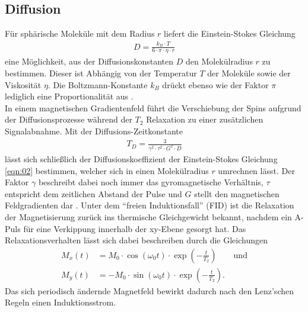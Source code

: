 \subsection{Diffusion}
\noindent Für sphärische Moleküle mit dem Radius $r$ liefert die
Einstein-Stokes Gleichung
\begin{align}
  D = \frac{k_B \cdot T}{6 \cdot \pi \cdot \eta \cdot r}
  \label{eqn:02}
\end{align}
\noindent eine Möglichkeit, aus der Diffusionskonstanten $D$ den Molekülradius
$r$ zu bestimmen. Dieser ist Abhängig von der Temperatur $T$ der Moleküle sowie
der Viskosität $\eta$. Die Boltzmann-Konstante $k_B$ drückt ebenso wie der
Faktor $\pi$ lediglich eine Proportionalität aus \cite{stokes}. \\
\noindent In einem magnetischen Gradientenfeld führt die Verschiebung der Spins
aufgrund der Diffusionsprozesse während der $T_2$ Relaxation zu einer
zusätzlichen Signalabnahme. Mit der Diffusions-Zeitkonstante
\begin{align}
  T_D = \frac{3}{\gamma^2 \cdot \tau^2 \cdot G^2 \cdot D}
  \label{diffusion_constant}
\end{align}
lässt sich schließlich
der Diffusionskoeffizient der Einstein-Stokes Gleichung \ref{eqn:02} bestimmen,
welcher sich in einen Molekülradius $r$ umrechnen lässt. Der Faktor $\gamma$
beschreibt dabei noch immer das gyromagnetische Verhältnis, $\tau$ entspricht
dem zeitlichen Abstand der Pulse und $G$ stellt den magnetischen Feldgradienten
dar
\cite{sample}.
\noindent Unter dem \enquote{freien Induktionsfall} (FID) ist die Relaxation
der Magnetisierung zurück ins thermische Gleichgewicht bekannt, nachdem ein
A-Puls für eine Verkippung innerhalb der xy-Ebene gesorgt hat. Das
Relaxationsverhalten lässt sich dabei beschreiben durch die Gleichungen
\begin{align}
  M_x(t) &= M_0 \cdot \cos{(\omega_0 t)} \cdot \exp{\left( - \frac{t}{T_2}\right)} \qquad \text{und} \\
  M_y(t) &= - M_0 \cdot \sin{(\omega_0 t)} \cdot \exp{\left( - \frac{t}{T_2}\right)}.
\end{align}
\noindent Das sich periodisch ändernde Magnetfeld bewirkt dadurch nach den
Lenz'schen Regeln einen Induktionsstrom.
